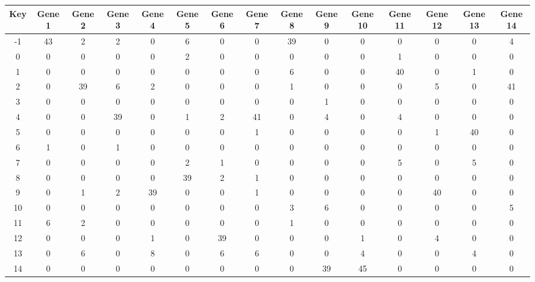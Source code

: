 \begin{tabular}{|c|c|c|c|c|c|c|c|c|c|c|c|c|c|c|}
\hline
Key & Gene 1 & Gene 2 & Gene 3 & Gene 4 & Gene 5 & Gene 6 & Gene 7 & Gene 8 & Gene 9 & Gene 10 & Gene 11 & Gene 12 & Gene 13 & Gene 14 \\
\hline
-1 & 43 & 2 & 2 & 0 & 6 & 0 & 0 & 39 & 0 & 0 & 0 & 0 & 0 & 4 \\
0 & 0 & 0 & 0 & 0 & 2 & 0 & 0 & 0 & 0 & 0 & 1 & 0 & 0 & 0 \\
1 & 0 & 0 & 0 & 0 & 0 & 0 & 0 & 6 & 0 & 0 & 40 & 0 & 1 & 0 \\
2 & 0 & 39 & 6 & 2 & 0 & 0 & 0 & 1 & 0 & 0 & 0 & 5 & 0 & 41 \\
3 & 0 & 0 & 0 & 0 & 0 & 0 & 0 & 0 & 1 & 0 & 0 & 0 & 0 & 0 \\
4 & 0 & 0 & 39 & 0 & 1 & 2 & 41 & 0 & 4 & 0 & 4 & 0 & 0 & 0 \\
5 & 0 & 0 & 0 & 0 & 0 & 0 & 1 & 0 & 0 & 0 & 0 & 1 & 40 & 0 \\
6 & 1 & 0 & 1 & 0 & 0 & 0 & 0 & 0 & 0 & 0 & 0 & 0 & 0 & 0 \\
7 & 0 & 0 & 0 & 0 & 2 & 1 & 0 & 0 & 0 & 0 & 5 & 0 & 5 & 0 \\
8 & 0 & 0 & 0 & 0 & 39 & 2 & 1 & 0 & 0 & 0 & 0 & 0 & 0 & 0 \\
9 & 0 & 1 & 2 & 39 & 0 & 0 & 1 & 0 & 0 & 0 & 0 & 40 & 0 & 0 \\
10 & 0 & 0 & 0 & 0 & 0 & 0 & 0 & 3 & 6 & 0 & 0 & 0 & 0 & 5 \\
11 & 6 & 2 & 0 & 0 & 0 & 0 & 0 & 1 & 0 & 0 & 0 & 0 & 0 & 0 \\
12 & 0 & 0 & 0 & 1 & 0 & 39 & 0 & 0 & 0 & 1 & 0 & 4 & 0 & 0 \\
13 & 0 & 6 & 0 & 8 & 0 & 6 & 6 & 0 & 0 & 4 & 0 & 0 & 4 & 0 \\
14 & 0 & 0 & 0 & 0 & 0 & 0 & 0 & 0 & 39 & 45 & 0 & 0 & 0 & 0 \\
\hline
\end{tabular}